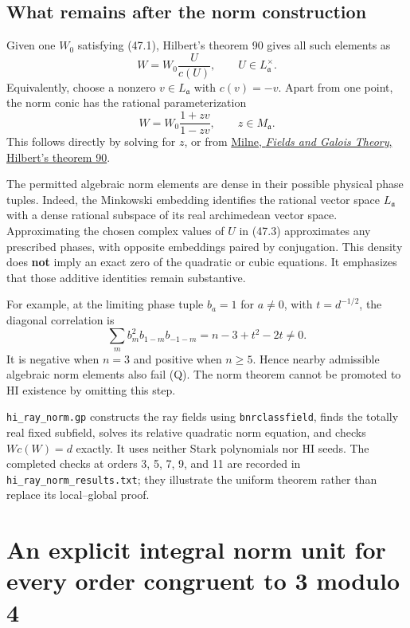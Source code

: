 \documentclass[11pt,reqno]{amsart}
\theoremstyle{plain}
\begin{document}
\subsection{What remains after the norm construction}\label{sec:47.3}

Given one \(W_0\) satisfying (47.1), Hilbert's theorem 90 gives all
such elements as
\begin{equation*}
 W=W_0\frac{U}{c(U)},\qquad U\in L_{\mathfrak a}^{\times}.
 \tag{47.3}
\end{equation*}
Equivalently, choose a nonzero \(v\in L_{\mathfrak a}\) with
\(c(v)=-v\). Apart from one point, the norm conic has the rational
parameterization
\[
 W=W_0\frac{1+zv}{1-zv},\qquad z\in M_{\mathfrak a}.
\]
This follows directly by solving for \(z\), or from
\href{https://jmilne.org/math/CourseNotes/FT500.pdf}{Milne, \emph{Fields and Galois Theory}, Hilbert's theorem 90}.

The permitted algebraic norm elements are dense in their possible
physical phase tuples. Indeed, the Minkowski embedding identifies
the rational vector space \(L_{\mathfrak a}\) with a dense rational
subspace of its real archimedean vector space. Approximating the
chosen complex values of \(U\) in (47.3) approximates any prescribed
phases, with opposite embeddings paired by conjugation. This density
does \textbf{not} imply an exact zero of the quadratic or cubic equations.
It emphasizes that those additive identities remain substantive.

For example, at the limiting phase tuple \(b_a=1\) for \(a\ne0\),
with \(t=d^{-1/2}\), the diagonal correlation is
\[
 \sum_m b_m^2b_{1-m}b_{-1-m}=n-3+t^2-2t\ne0.
\]
It is negative when \(n=3\) and positive when \(n\ge5\). Hence
nearby admissible algebraic norm elements also fail (Q). The norm
theorem cannot be promoted to HI existence by omitting this step.

\texttt{hi\_\allowbreak ray\_\allowbreak norm.gp} constructs the ray fields using \texttt{bnrclassfield},
finds the totally real fixed subfield, solves its relative quadratic
norm equation, and checks \(Wc(W)=d\) exactly. It uses neither Stark
polynomials nor HI seeds. The completed checks at orders 3, 5, 7, 9,
and 11 are recorded in \texttt{hi\_\allowbreak ray\_\allowbreak norm\_\allowbreak results.txt}; they illustrate the
uniform theorem rather than replace its local--global proof.

\section{An explicit integral norm unit for every order congruent to 3 modulo 4}\label{sec:48}
\end{document}

